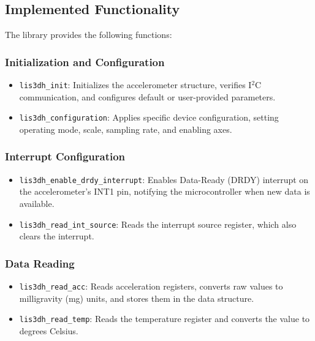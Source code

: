 \subsection{Implemented Functionality}

The library provides the following functions:

\subsubsection{Initialization and Configuration}

\begin{itemize}
    \item \texttt{lis3dh\_init}: Initializes the accelerometer structure, verifies 
    I$^2$C communication, and configures default or user-provided parameters.
    
    \item \texttt{lis3dh\_configuration}: Applies specific device configuration, 
    setting operating mode, scale, sampling rate, and enabling axes.
\end{itemize}

\subsubsection{Interrupt Configuration}

\begin{itemize}
    \item \texttt{lis3dh\_enable\_drdy\_interrupt}: Enables Data-Ready (DRDY) 
    interrupt on the accelerometer's INT1 pin, notifying the microcontroller when 
    new data is available.
    
    \item \texttt{lis3dh\_read\_int\_source}: Reads the interrupt source register, 
    which also clears the interrupt.
\end{itemize}

\subsubsection{Data Reading}

\begin{itemize}
    \item \texttt{lis3dh\_read\_acc}: Reads acceleration registers, converts raw 
    values to milligravity (mg) units, and stores them in the data structure.
    
    \item \texttt{lis3dh\_read\_temp}: Reads the temperature register and converts 
    the value to degrees Celsius.
\end{itemize}

